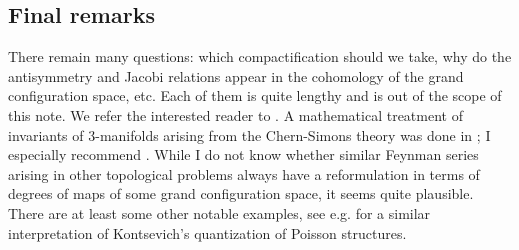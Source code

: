 \documentclass[10pt]{amsart}
\theoremstyle{definition}
\theoremstyle{remark}
\begin{document}
\subsection{Final remarks}
There remain many questions: which compactification should we
take, why do the antisymmetry and Jacobi relations appear in
the cohomology of the grand configuration space, etc.
Each of them is quite lengthy and is out of the scope of this
note. We refer the interested reader to \cite{BT, Poi, T}.
A mathematical treatment of invariants of 3-manifolds arising
from the Chern-Simons theory was done in \cite{AS, BC}; I
especially recommend \cite{KT}. While I do not know whether
similar Feynman series arising in other topological problems
always have a reformulation in terms of degrees of maps of
some grand configuration space, it seems quite plausible.
There are at least some other notable examples, see e.g.
\cite{P} for a similar interpretation of Kontsevich's
quantization of Poisson structures.
\end{document}
